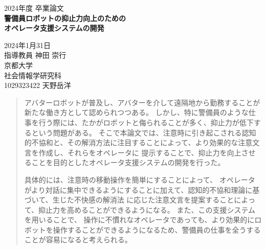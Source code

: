 \documentclass[11pt,a4j]{jreport}
\begin{document}
\thispagestyle{empty}
\begin{center}

\vspace{20mm}
{\Large\noindent 2024年度 卒業論文}\\
\vspace{40mm}
{\huge\noindent\textbf{警備員ロボットの抑止力向上のための}}\\
\medskip
{\huge\noindent\textbf{オペレータ支援システムの開発}}\\
\vspace{\baselineskip}
\vspace{40mm}

{\Large\noindent
2024年1月31日\\
\vspace{\baselineskip}
指導教員 神田  崇行\\
\vspace{\baselineskip}
京都大学\\
社会情報学研究科\\
\vspace{\baselineskip}
1029323422 天野岳洋\\
}
\vspace{40mm}

\end{center}

\thispagestyle{empty}
\clearpage

\renewcommand{\abstractname}{要旨}

\begin{abstract}
アバターロボットが普及し、アバターを介して遠隔地から勤務することが新たな働き方として認められつつある。
しかし、特に警備員のような仕事を行う際には、たかがロボットと侮られることが多く、抑止力が低下するという問題がある。
そこで本論文では、注意時に引き起こされる認知的不協和と、その解消方法に注目することによって、より効果的な注意文言を作成し、それらをオペレータに
提示することで、抑止力を向上させることを目的としたオペレータ支援システムの開発を行った。

具体的には、注意時の移動操作を簡単にすることによって、
オペレータがより対話に集中できるようにすることに加えて、認知的不協和理論に基づいて、生じた不快感の解消法
に応じた注意文言を提案することによって、抑止力を高めることができるようになる。
また、この支援システムを用いることで、
操作に不慣れなオペレータであっても、より効果的にロボットを操作することができるようになるため、警備員の仕事を全うすることが容易になると考えられる。
\end{abstract}
\end{document}
